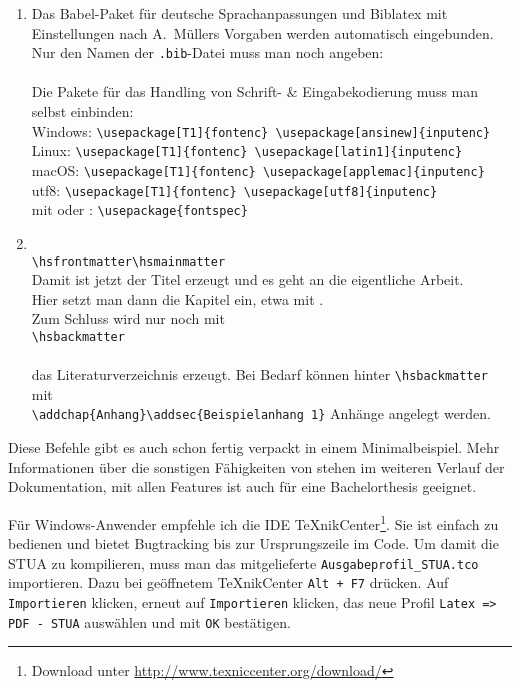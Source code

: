 \begin{enumerate}
		\verb!\hssupervisorname{Prof.~Adrian~Müller, PMP, PSM-I, CSM}!
	\item Das Babel-Paket für deutsche Sprachanpassungen und Biblatex mit
		Einstellungen nach A.~Müllers Vorgaben werden automatisch eingebunden. Nur
		den Namen der \verb!.bib!-Datei muss man noch angeben:\\
		\verb!!\\
		Die
		Pakete für das Handling von Schrift- \& Eingabekodierung muss man selbst
		einbinden:\\
		Windows: \verb!\usepackage[T1]{fontenc} \usepackage[ansinew]{inputenc}!\\
		Linux: \verb!\usepackage[T1]{fontenc} \usepackage[latin1]{inputenc}!\\
		macOS: \verb!\usepackage[T1]{fontenc} \usepackage[applemac]{inputenc}!\\
		utf8: \verb!\usepackage[T1]{fontenc} \usepackage[utf8]{inputenc}!\\
		mit  oder : \verb!\usepackage{fontspec}!
	\item \verb!!\\
		\verb!\hsfrontmatter\hsmainmatter!\\
		Damit ist jetzt der Titel erzeugt und es geht an die eigentliche Arbeit.\\
		Hier setzt man dann die Kapitel ein, etwa mit \verb!!.\\
		Zum Schluss wird nur noch mit\\
		\verb!\hsbackmatter!\\
		\verb!!\\
		das Literaturverzeichnis erzeugt. Bei Bedarf können hinter
		\verb!\hsbackmatter! mit\\\verb!\addchap{Anhang}\addsec{Beispielanhang 1}!
		Anhänge angelegt werden.
\end{enumerate}

Diese Befehle gibt es auch schon fertig verpackt in einem Minimalbeispiel. Mehr
Informationen über die sonstigen Fähigkeiten von \HSKLbook
stehen im weiteren Verlauf der Dokumentation, mit allen Features ist
\HSKLbook auch für eine Bachelorthesis geeignet.

Für Windows-Anwender empfehle ich die IDE \TeX{}nikCenter\footnote{Download
unter \url{http://www.texniccenter.org/download/}}. Sie ist einfach zu
bedienen und bietet Bugtracking bis zur Ursprungszeile im Code. Um damit die
STUA zu kompilieren, muss man das mitgelieferte \verb!Ausgabeprofil_STUA.tco!
importieren. Dazu bei geöffnetem \TeX{}nikCenter \verb!Alt + F7! drücken. Auf
\verb!Importieren! klicken, erneut auf \verb!Importieren! klicken, das neue
Profil \verb!Latex => PDF - STUA! auswählen und mit \verb!OK! bestätigen.


